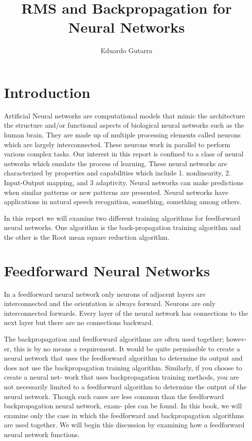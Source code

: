 \documentclass[11pt]{article}
\title{RMS and Backpropagation for Neural Networks}
\author{Eduardo Gutarra}
\begin{document}
	
\ifpdf
{}
\else
{}
\fi
	
\maketitle
	
\section{Introduction} %
\label{sec:introduction}

Artificial Neural networks are computational models that mimic the architecture the structure and/or functional aspects of biological
neural networks such as the human brain. They are made up of multiple processing elements called neurons which are largely
interconnected. These neurons work in parallel to perform various complex tasks. Our interest in this report is confined to a class of
neural networks which emulate the process of learning. These neural networks are characterized by properties and capabilities which
include 1. nonlinearity, 2. Input-Output mapping, and 3 adaptivity. Neural networks can make predictions when similar patterns or new
patterns are presented. Neural networks have applications in natural speech recognition, something, something among others.

In this report we will examine two different training algorithms for feedforward neural networks. One algorithm is the back-propagation
training algorithm and the other is the Root mean square reduction algorithm.

\section{Feedforward Neural Networks} %
\label{sec:feedforward_neural_networks}

In a feedforward neural network only neurons of adjacent layers are interconnected and the orientation is always forward. Neurons are
only interconnected forwards. Every layer of the neural network has connections to the next layer but there are no connections
backward.

The backpropagation and feedforward algorithms are often used together; howev- er, this is by no means a requirement. It would be quite
permissible to create a neural network that uses the feedforward algorithm to determine its output and does not use the backpropagation
training algorithm. Similarly, if you choose to create a neural net- work that uses backpropagation training methods, you are not
necessarily limited to a feedforward algorithm to determine the output of the neural network. Though such cases are less common than
the feedforward backpropagation neural network, exam- ples can be found. In this book, we will examine only the case in which the
feedforward and backpropagation algorithms are used together. We will begin this discussion by examining how a feedforward neural
network functions.
\end{document}
